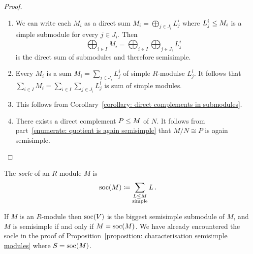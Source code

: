 \begin{proof}
  \leavevmode
  \begin{enumerate}
    \item
      We can write each $M_i$ as a direct sum $M_i = \bigoplus_{j \in J_i} L^i_j$ where $L^i_j \leq M_i$ is a simple submodule for every $j \in J_i$.
      Then
      \[
          \bigoplus_{i \in I} M_i
        = \bigoplus_{i \in I} \bigoplus_{j \in J_i} L^i_j
      \]
      is the direct sum of submodules and therefore semisimple.
    \item
      Every $M_i$ is a sum $M_i = \sum_{j \in J_i} L^i_j$ of simple $R$-modulse $L^i_j$.
      It follows that $\sum_{i \in I} M_i = \sum_{i \in I} \sum_{j \in J_i} L^i_j$ is sum of simple modules.
    \item
      This follows from Corollary~\ref{corollary: direct complements in submodules}.
    \item
      There exists a direct complement $P \leq M$ of $N$.
      It follows from part~\ref*{enumerate: quotient is again semisimple} that $M/N \cong P$ is again semisimple.
    \qedhere
  \end{enumerate}
\end{proof}


\begin{definition}
  The \emph{socle} of an $R$-module $M$ is
  \[
              \operatorname{soc}(M)
    \coloneqq  \sum_{\substack{L \leq M \\ \text{simple}}} L \,.
  \]
\end{definition}


\begin{remark}
  If $M$ is an $R$-module then $\operatorname{soc}(V)$ is the biggest semisimple submodule of $M$, and $M$ is semisimple if and only if $M = \operatorname{soc}(M)$.
  We have already encountered the socle in the proof of Proposition~\ref{proposition: characterisation semisimple modules} where $S = \operatorname{soc}(M)$.
\end{remark}




